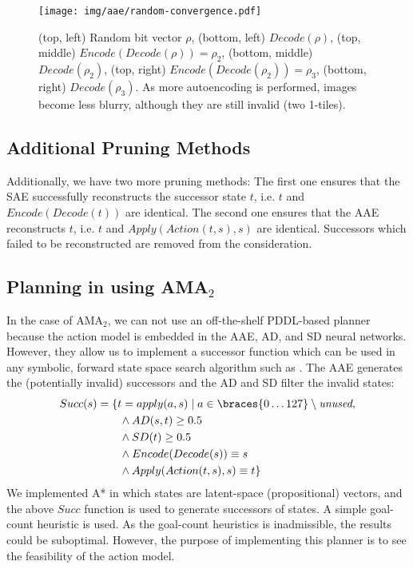 \documentclass[11pt]{article}
\begin{document}
\begin{figure}[tbp]
 \centering
 \texttt{[image: img/aae/random-convergence.pdf]}
 \caption{
(top, left) Random bit vector $\rho$,
(bottom, left) $Decode(\rho)$,
(top, middle)  $Encode(Decode(\rho))=\rho_2$,
(bottom, middle) $Decode(\rho_2)$,
(top, right)  $Encode(Decode(\rho_2))=\rho_3$,
(bottom, right) $Decode(\rho_3)$.
As more autoencoding is performed, images become less blurry,
 although they are still invalid (two 1-tiles).
}
\label{fig:random-bit}
\end{figure}

\subsection{Additional Pruning Methods}

Additionally, we have two more pruning methods:
The first one ensures that the SAE successfully reconstructs the successor state $t$, i.e. $t$ and $Encode(Decode(t))$ are identical.
The second one ensures that the AAE reconstructs $t$, i.e. $t$ and $Apply(Action(t,s),s)$ are identical.
Successors which failed to be reconstructed are removed from the consideration.

\subsection{Planning in \latentplanner using AMA$_2$}

In the case of AMA$_2$, we can not use an off-the-shelf PDDL-based planner because the action model is embedded in
the AAE, AD, and SD neural networks.
However, they allow us to implement a successor function which can be used in any symbolic, 
forward state space search algorithm such as \astar \cite{hart1968formal}.
The AAE generates the (potentially invalid) successors and
 the AD and SD filter the invalid states:
\begin{align*}
  Succ(s) &= \{t = apply(a,s) \; | \; a \in \braces{0\ldots 127} \setminus \textit{unused},\\
          & \qquad \land AD(s,t) \geq 0.5 \\
          & \qquad \land SD(t) \geq 0.5 \\
          & \qquad \land Encode(Decode(s)) \equiv s \\
          & \qquad \land Apply(Action(t,s),s) \equiv t \}
\end{align*}
We implemented A* in which states are latent-space (propositional) vectors, and the above $Succ$ function is used to generate successors of states.
A simple goal-count heuristic is used.
As the goal-count heuristics is inadmissible, the results could be suboptimal.
However, the purpose of implementing this planner is to see the feasibility of the action model.
\end{document}
